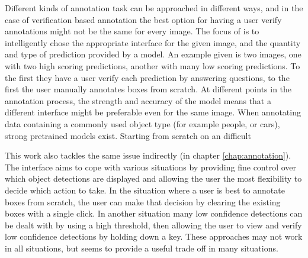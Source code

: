 Different kinds of annotation task can be approached in different ways, and in the case of verification based annotation the best option for having a user verify annotations might not be the same for every image. The focus of \cite{Konyushkova2017} is to intelligently chose the appropriate interface for the given image, and the quantity and type of prediction provided by a model. An example given is two images, one with two high scoring predictions, another with many low scoring predictions. To the first they have a user  verify each prediction by answering questions, to the first the user manually annotates boxes from scratch. At different points in the annotation process, the strength and accuracy of the model means that a different interface might be preferable even for the same image. When annotating data containing a commonly used object type (for example people, or cars), strong pretrained models exist. Starting from scratch on an difficult 

This work also tackles the same issue indirectly (in chapter \ref{chap:annotation}). The interface aims to cope with various situations by providing fine control over which object detections are displayed and allowing the user the most flexibility to decide which action to take. In the situation where a user is best to annotate boxes from scratch, the user can make that decision by clearing the existing boxes with a single click. In another situation many low confidence detections can be dealt with by using a high threshold, then allowing the user to view and verify low confidence detections by holding down a key. These approaches may not work in all situations, but seems to provide a useful trade off in many situations.









